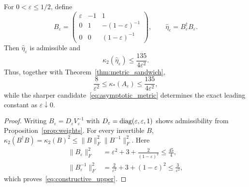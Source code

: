 \begin{proposition}
\label{prop:constructive_metric}
For $0<\varepsilon\leq1/2$, define
\begin{equation}\label{eq:constructive_eta}
 B_\varepsilon=
 \begin{pmatrix}
 \varepsilon&-1&1\\
 0&1&-(1-\varepsilon)^{-1}\\
 0&0&(1-\varepsilon)^{-1}
 \end{pmatrix},\qquad
 \widehat\eta_\varepsilon=B_\varepsilon^\dagger B_\varepsilon.
\end{equation}
Then $\widehat\eta_\varepsilon$ is admissible and
\begin{equation}\label{eq:constructive_upper}
 \kappa_2(\widehat\eta_\varepsilon)
 \leq\frac{135}{4\varepsilon^2}.
\end{equation}
Thus, together with Theorem~\ref{thm:metric_sandwich},
\begin{equation}
 \frac8{\varepsilon^2}\leq\kappa_*(A_\varepsilon)
 \leq\frac{135}{4\varepsilon^2},
\end{equation}
while the sharper candidate~\eqref{eq:asymptotic_metric} determines the
exact leading constant as $\varepsilon\downarrow0$.
\end{proposition}
\begin{proof}
Writing $B_\varepsilon=D_\varepsilon V_\varepsilon^{-1}$ with
$D_\varepsilon=\operatorname{diag}(\varepsilon,\varepsilon,1)$ shows admissibility
from Proposition~\ref{prop:weights}.  For every invertible $B$,
$\kappa_2(B^\dagger B)=\kappa_2(B)^2
\leq\|B\|_F^2\|B^{-1}\|_F^2$.  Here
\begin{align}
 \|B_\varepsilon\|_F^2
 &=\varepsilon^2+3+\frac{2}{(1-\varepsilon)^2}
 \leq\frac{45}{4},\\
 \|B_\varepsilon^{-1}\|_F^2
 &=\frac{2}{\varepsilon^2}+3+(1-\varepsilon)^2
 \leq\frac{3}{\varepsilon^2},
\end{align}
which proves~\eqref{eq:constructive_upper}.
\end{proof}

